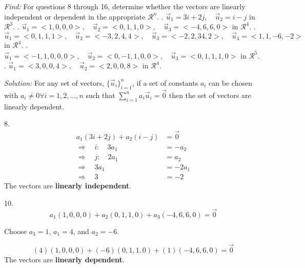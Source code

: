 \documentclass[11pt]{homework}
\begin{document}
\maketitle

\emph{Find:}
\newline
For questions 8 through 16, determine whether the vectors are 
linearly independent or dependent in the appropriate $\mathcal{R}^n$.
\newline
{}.  $\vec u_1 = 3i +2j, \quad \vec u_2 = i - j$ in $\mathcal{R}^3$.
. $\vec u_1 = <1,0,0,0>, \quad \vec u_2 = <0,1,1,0>, \quad \vec u_3 = <-4,6,6,0>$ in $\mathcal{R}^4$.
. $\vec u_1 = <0,1,1,1>, \quad \vec u_2 = <-3,2,4,4>, \quad \vec u_3 = <-2,2,34,2>, \quad \vec u_4 = <1,1,-6,-2>$ in $\mathcal{R}^4$.
. $\vec u_1 = <-1,1,0,0,0>, \quad \vec u_2 = <0,-1,1,0,0>, \quad \vec u_3 = <0,1,1,1,0>$ in $\mathcal{R}^5$.
. $\vec u_1 = <3,0,0,4>, \quad \vec u_2 = <2,0,0,8>$ in $\mathcal{R}^4$.
\newline

\emph{Solution:}
\newline
For any set of vectors, $\{\vec u_i\}_{i=1}^{n}$, if a set of constants $a_i$ can be chosen
with $a_i \neq 0 \forall i=1,2,...,n$ such that $\sum_{i=1}^{n} a_i \vec u_i = \vec 0$ then 
the set of vectors are linearly dependent.

8. 
\begin{align*}
a_1 ( 3i + 2j) + a_2 (i - j) &= \vec 0 \\
  \Rightarrow \quad i: \quad 3 a_1 &= -a_2 \\
  \Rightarrow \quad j: \quad 2 a_1 &= a_2 \\
  \Rightarrow \quad 3 a_1 &= -2 a_1 \\
  \Rightarrow \quad 3 &= -2
\end{align*}
The vectors are \textbf{linearly independent}.

10. 
\begin{equation*}
a_1(1,0,0,0) + a_2 (0,1,1,0) +a_3 (-4,6,6,0) = \vec 0 
\end{equation*}

Choose $a_3 = 1$, $a_1 = 4$, and $a_2 = -6$.

\begin{equation*}
(4)(1,0,0,0) + (-6) (0,1,1,0) + (1) (-4,6,6,0) = \vec 0 
\end{equation*}
The vectors are \textbf{linearly dependent}.
\end{document}
